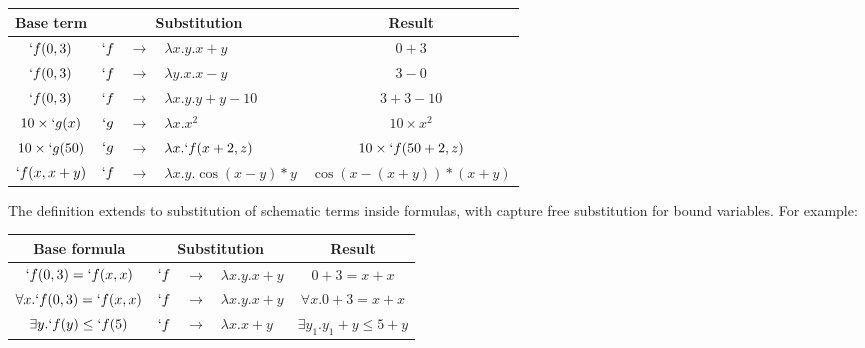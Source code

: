 \begin{ex}
  \begin{center}
    \begin{tabular}{|c|r c l|c|}
      \noalign{\vspace{0.5em}}
      \hline
      Base term            & \multicolumn{3}{c|}{Substitution} & Result                                                                 \\
      \hline
      $`f(0, 3)$           & $`f$                              & $\rightarrow$ & $\lambda x.y. x+y$         & $0+3$                     \\
      $`f(0, 3)$           & $`f$                              & $\rightarrow$ & $\lambda y.x. x-y$         & $3-0$                     \\
      $`f(0, 3)$           & $`f$                              & $\rightarrow$ & $\lambda x.y. y+y-10$      & $3+3-10$                  \\
      $10 \times {`g(x)}$  & $`g$                              & $\rightarrow$ & $\lambda x. x^2$           & $10 \times x^2$           \\
      $10 \times {`g(50)}$ & $`g$                              & $\rightarrow$ & $\lambda x. `f(x+2, z)$    & $10 \times {`f(50+2, z)}$ \\
      $`f(x, x+y)$         & $`f$                              & $\rightarrow$ & $\lambda x.y. \cos(x-y)*y$ & $\cos(x-(x+y))*(x+y)$     \\
      \hline
    \end{tabular}
  \end{center}
\end{ex}


The definition extends to substitution of schematic terms inside formulas, with capture free substitution for bound variables. For example:

\begin{ex}
  \begin{center}
    \begin{tabular}{|c|r c l|c|}
      \noalign{\vspace{0.5em}}
      \hline
      Base formula                     & \multicolumn{3}{c|}{Substitution} & Result                                                             \\
      \hline
      $`f(0, 3) = `f(x, x)$            & $`f$                              & $\rightarrow$ & $\lambda x.y. x+y$ & $0+3 = x+x$                   \\
      $\forall x. `f(0, 3) = `f(x, x)$ & $`f$                              & $\rightarrow$ & $\lambda x.y. x+y$ & $\forall x. 0+3 = x+x$        \\

      $\exists y. `f(y) \leq `f(5)$    & $`f$                              & $\rightarrow$ & $\lambda x. x+y$   & $\exists y_1. y_1+y \leq 5+y$ \\

      \hline
    \end{tabular}
  \end{center}
\end{ex}

